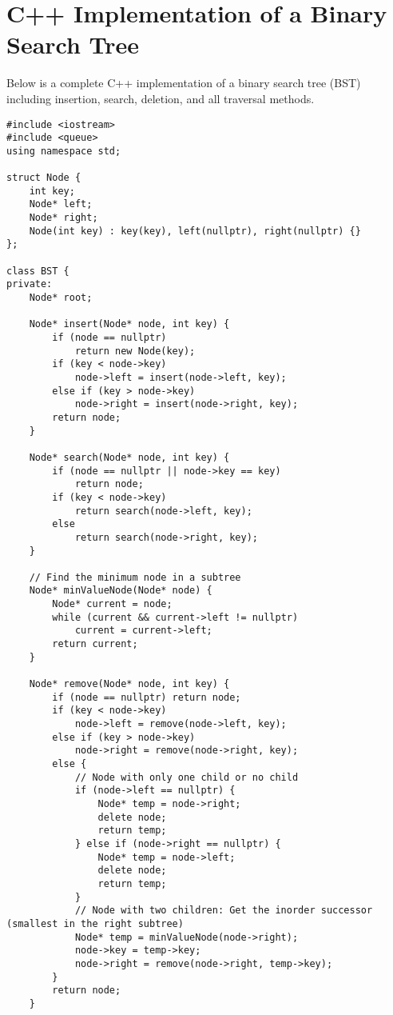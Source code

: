 \section{C++ Implementation of a Binary Search Tree}
Below is a complete C++ implementation of a binary search tree (BST) including insertion, search, deletion, and all traversal methods.

\begin{lstlisting}[caption={C++ implementation of a Binary Search Tree}]
#include <iostream>
#include <queue>
using namespace std;

struct Node {
    int key;
    Node* left;
    Node* right;
    Node(int key) : key(key), left(nullptr), right(nullptr) {}
};

class BST {
private:
    Node* root;
    
    Node* insert(Node* node, int key) {
        if (node == nullptr)
            return new Node(key);
        if (key < node->key)
            node->left = insert(node->left, key);
        else if (key > node->key)
            node->right = insert(node->right, key);
        return node;
    }
    
    Node* search(Node* node, int key) {
        if (node == nullptr || node->key == key)
            return node;
        if (key < node->key)
            return search(node->left, key);
        else
            return search(node->right, key);
    }
    
    // Find the minimum node in a subtree
    Node* minValueNode(Node* node) {
        Node* current = node;
        while (current && current->left != nullptr)
            current = current->left;
        return current;
    }
    
    Node* remove(Node* node, int key) {
        if (node == nullptr) return node;
        if (key < node->key)
            node->left = remove(node->left, key);
        else if (key > node->key)
            node->right = remove(node->right, key);
        else {
            // Node with only one child or no child
            if (node->left == nullptr) {
                Node* temp = node->right;
                delete node;
                return temp;
            } else if (node->right == nullptr) {
                Node* temp = node->left;
                delete node;
                return temp;
            }
            // Node with two children: Get the inorder successor (smallest in the right subtree)
            Node* temp = minValueNode(node->right);
            node->key = temp->key;
            node->right = remove(node->right, temp->key);
        }
        return node;
    }
    

\end{lstlisting}

